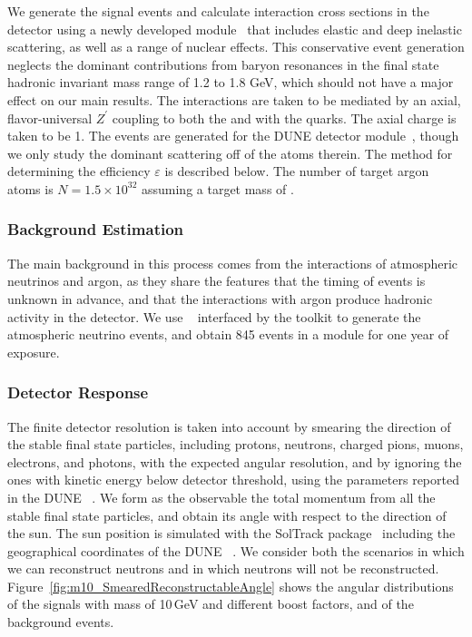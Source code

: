 We generate the signal events and calculate interaction cross sections in the detector using a newly developed  module~\cite{Andreopoulos:2009rq,Andreopoulos:2015wxa,Berger:2018} that includes elastic and deep inelastic scattering, as well as a range of nuclear effects. This conservative event generation neglects the dominant contributions from baryon resonances in the final state hadronic invariant mass range of 1.2 to 1.8 GeV, which should not have a major effect on our main results. The interactions are taken to be mediated by an axial, flavor-universal $Z^\prime$ coupling to both the  and with the quarks. The axial charge is taken to be 1. 
The events are generated for the \nominalmodsize DUNE detector module~\cite{dunetpc_code}, though we only study the dominant scattering off of the  atoms therein. The method for determining the efficiency $\varepsilon$ is described below. The number of target argon atoms is $N = 1.5  \times 10^{32}$ assuming a target mass of \nominalmodsize{}.

\subsubsection{Background Estimation}
\label{sec:background}

The main background in this process comes from the  
interactions of atmospheric neutrinos and argon,
as they share the features that the timing of events is unknown in advance,
and that the interactions with argon produce hadronic activity in the detector.
We use ~\cite{Andreopoulos:2009rq,Andreopoulos:2015wxa}
interfaced by the  toolkit to generate the  atmospheric
neutrino events, and obtain 845 events in a \nominalmodsize{} module for one year of
exposure.

\subsubsection{Detector Response}
\label{sec:detector_resp}

The finite detector resolution is taken into
account by smearing the direction of the stable final state particles, 
including protons, neutrons, charged pions, muons, electrons, and photons,
with the expected angular resolution,
and by ignoring the ones with kinetic energy below detector threshold,
using the parameters reported in the DUNE ~\cite{Acciarri:2015uup}.
We form as the observable the total momentum from all the stable final state particles,
and obtain its angle with respect to the direction of the sun.
The sun position is simulated with the SolTrack package~\cite{SolTrack}
including the geographical coordinates of the DUNE ~\cite{DUNE_DocDB136}.
We consider both the scenarios in which we can reconstruct neutrons and in which 
neutrons will not be reconstructed.
Figure~\ref{fig:m10_SmearedReconstructableAngle} shows the angular distributions of
the  signals with mass of 10\,GeV and different boost factors,
and of the background events.

